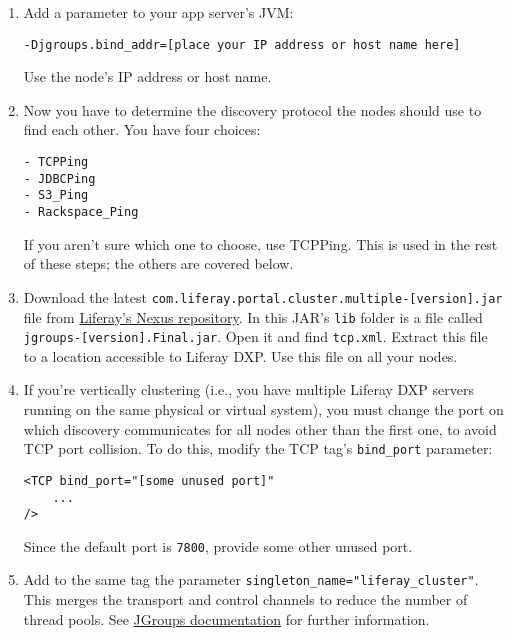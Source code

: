 \begin{enumerate}
\def\labelenumi{\arabic{enumi}.}
\item
  Add a parameter to your app server's JVM:

\begin{verbatim}
-Djgroups.bind_addr=[place your IP address or host name here]
\end{verbatim}

  Use the node's IP address or host name.
\item
  Now you have to determine the discovery protocol the nodes should use
  to find each other. You have four choices:

\begin{verbatim}
- TCPPing
- JDBCPing
- S3_Ping
- Rackspace_Ping
\end{verbatim}

  If you aren't sure which one to choose, use TCPPing. This is used in
  the rest of these steps; the others are covered below.
\item
  Download the latest
  \texttt{com.liferay.portal.cluster.multiple-{[}version{]}.jar} file
  from
  \href{https://repository.liferay.com/nexus/content/repositories/liferay-public-releases/com/liferay/com.liferay.portal.cluster.multiple}{Liferay's
  Nexus repository}. In this JAR's \texttt{lib} folder is a file called
  \texttt{jgroups-{[}version{]}.Final.jar}. Open it and find
  \texttt{tcp.xml}. Extract this file to a location accessible to
  Liferay DXP. Use this file on all your nodes.
\item
  If you're vertically clustering (i.e., you have multiple Liferay DXP
  servers running on the same physical or virtual system), you must
  change the port on which discovery communicates for all nodes other
  than the first one, to avoid TCP port collision. To do this, modify
  the TCP tag's \texttt{bind\_port} parameter:

\begin{verbatim}
<TCP bind_port="[some unused port]"
    ... 
/>
\end{verbatim}

  Since the default port is \texttt{7800}, provide some other unused
  port.
\item
  Add to the same tag the parameter
  \texttt{singleton\_name="liferay\_cluster"}. This merges the transport
  and control channels to reduce the number of thread pools. See
  \href{http://www.jgroups.org/manual-3.x/html/user-advanced.html}{JGroups
  documentation} for further information.


\end{enumerate}
